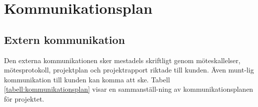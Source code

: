 \documentclass[a4paper]{article}
\begin{document}
\section{Kommunikationsplan}
\label{sec:kommunikationsplan}


\subsection*{Extern kommunikation}

Den externa kommunikationen sker mestadels skriftligt genom möteskallelser, mötesprotokoll, projektplan och projektrapport riktade till kunden. Även munt-lig kommunikation till kunden kan komma att ske. Tabell \ref{tabell:kommunikationsplan} visar en sammanställ-ning av kommunikationsplanen för projektet.
\end{document}
